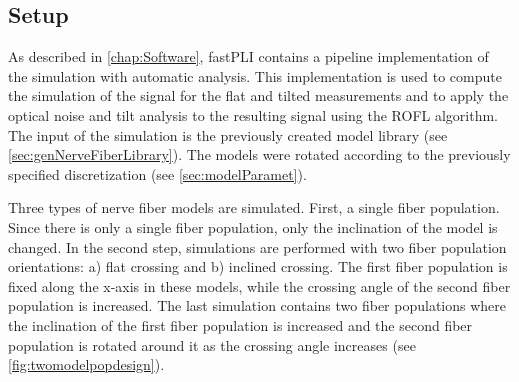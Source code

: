 \subsection{Setup}
\label{sec:simParameterEnv}
% 
%
As described in \cref{chap:Software}, \ac{fastPLI} contains a pipeline implementation of the simulation with automatic analysis.
This implementation is used to compute the simulation of the signal for the flat and tilted measurements and to apply the optical noise and tilt analysis to the resulting signal using the \ac{ROFL} algorithm. 
The input of the simulation is the previously created model library (see \cref{sec:genNerveFiberLibrary}).
The models were rotated according to the previously specified discretization (see \cref{sec:modelParamet}).
\par
% 
Three types of nerve fiber models are simulated.
First, a single fiber population.
Since there is only a single fiber population, only the inclination of the model is changed.
In the second step, simulations are performed with two fiber population orientations: a) flat crossing and b) inclined crossing.
The first fiber population is fixed along the x-axis in these models, while the crossing angle of the second fiber population is increased.
The last simulation contains two fiber populations where the inclination of the first fiber population is increased and the second fiber population is rotated around it as the crossing angle increases (see \cref{fig:twomodelpopdesign}).
\par
% 
